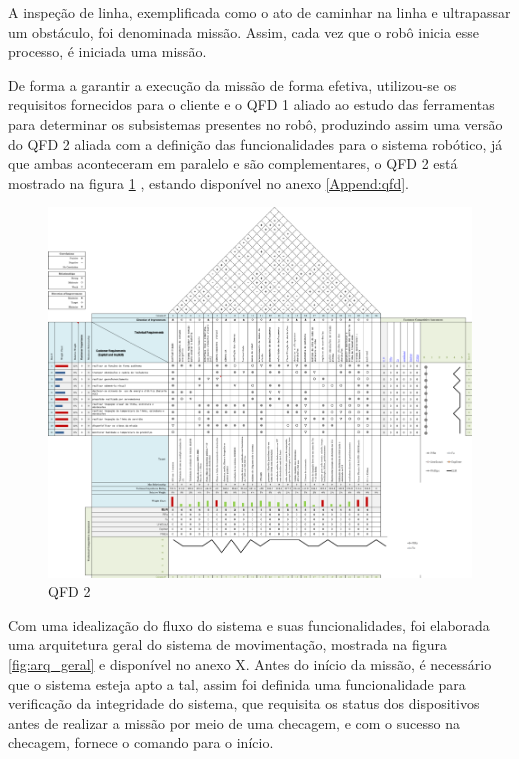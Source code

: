 A inspeção de linha, exemplificada como o ato de caminhar na linha e ultrapassar um obstáculo, foi denominada missão. Assim, cada vez que o robô inicia esse processo, é iniciada uma missão.

De forma a garantir a execução da missão de forma efetiva, utilizou-se os requisitos fornecidos para o cliente e o QFD 1 aliado ao estudo das ferramentas para determinar os subsistemas presentes no robô, produzindo assim uma versão do QFD 2 aliada com a definição das funcionalidades para o sistema robótico, já que ambas aconteceram em paralelo e são complementares, o QFD 2 está mostrado na figura \ref{fig:qfd2} , estando disponível no anexo \ref{Append:qfd}.

\begin{figure}[H]
	\centering
	\includegraphics[scale=1]{Figures/qfdelir-2.png}
	\caption{QFD 2}
	\label{fig:qfd2}
\end{figure}

Com uma idealização do fluxo do sistema e suas funcionalidades, foi elaborada uma arquitetura geral do sistema de movimentação, mostrada na figura \ref{fig:arq_geral} e disponível no anexo X.  Antes do início da missão, é necessário que o sistema esteja apto a tal, assim foi definida uma funcionalidade para verificação da integridade do sistema, que requisita os status dos dispositivos antes de realizar a missão por meio de uma checagem, e com o sucesso na checagem, fornece o comando para o início.

